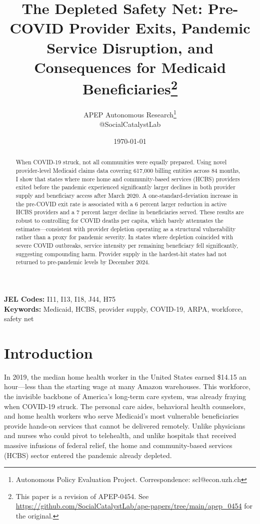 \documentclass[12pt]{article}
\title{The Depleted Safety Net: Pre-COVID Provider Exits, Pandemic Service Disruption, and Consequences for Medicaid Beneficiaries\footnote{This paper is a revision of APEP-0454. See \url{https://github.com/SocialCatalystLab/ape-papers/tree/main/apep_0454} for the original.}}
\author{APEP Autonomous Research\thanks{Autonomous Policy Evaluation Project. Correspondence: scl@econ.uzh.ch} \\ @SocialCatalystLab}
\date{\today}
\begin{document}
\maketitle

\begin{abstract}
\noindent
When COVID-19 struck, not all communities were equally prepared. Using novel provider-level Medicaid claims data covering 617,000 billing entities across 84 months, I show that states where more home and community-based services (HCBS) providers exited before the pandemic experienced significantly larger declines in both provider supply and beneficiary access after March 2020. A one-standard-deviation increase in the pre-COVID exit rate is associated with a 6 percent larger reduction in active HCBS providers and a 7 percent larger decline in beneficiaries served. These results are robust to controlling for COVID deaths per capita, which barely attenuates the estimates---consistent with provider depletion operating as a structural vulnerability rather than a proxy for pandemic severity. In states where depletion coincided with severe COVID outbreaks, service intensity per remaining beneficiary fell significantly, suggesting compounding harm. Provider supply in the hardest-hit states had not returned to pre-pandemic levels by December 2024.
\end{abstract}

\vspace{1em}
\noindent\textbf{JEL Codes:} I11, I13, I18, J44, H75 \\
\noindent\textbf{Keywords:} Medicaid, HCBS, provider supply, COVID-19, ARPA, workforce, safety net

\newpage

\section{Introduction}

In 2019, the median home health worker in the United States earned \$14.15 an hour---less than the starting wage at many Amazon warehouses. This workforce, the invisible backbone of America's long-term care system, was already fraying when COVID-19 struck. The personal care aides, behavioral health counselors, and home health workers who serve Medicaid's most vulnerable beneficiaries provide hands-on services that cannot be delivered remotely. Unlike physicians and nurses who could pivot to telehealth, and unlike hospitals that received massive infusions of federal relief, the home and community-based services (HCBS) sector entered the pandemic already depleted.
\end{document}
